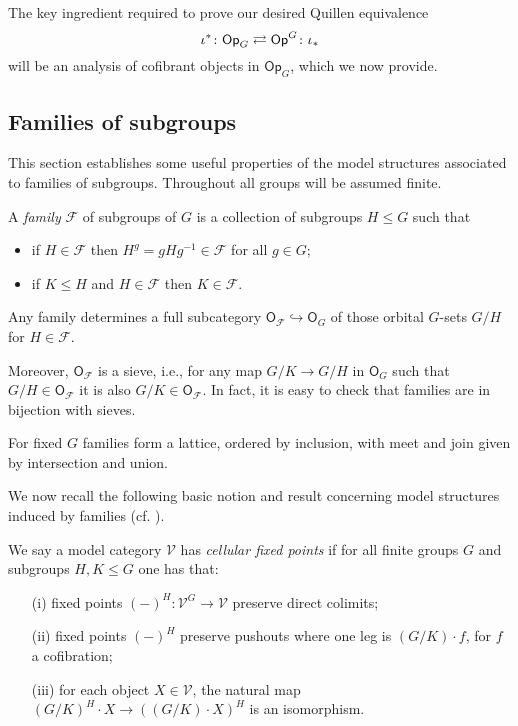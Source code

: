 \documentclass[a4paper,10pt]{article}%
\begin{document}
The key ingredient required to prove our desired Quillen equivalence
\[
	\iota^{\**} \colon
	\mathsf{Op}_G \rightleftarrows \mathsf{Op}^G
	\colon \iota_{\**}
\]
will be an analysis of cofibrant objects in $\mathsf{Op}_G$, which we now provide.


\subsection{Families of subgroups}


This section establishes some useful properties of the model structures associated to families of subgroups. Throughout all groups will be assumed finite.


\begin{definition}\label{FAMILY DEF}
	A \textit{family} $\mathcal{F}$ of subgroups of $G$ is a collection of subgroups 
	$H \leq G$ such that
	\begin{itemize}
	\item if $H \in \mathcal{F}$ then 
	$H^g = gHg^{-1} \in \mathcal{F}$ for all $g \in G$;
	\item if $K \leq H$ and $H \in \mathcal{F}$ then
	$K \in \mathcal{F}$.
	\end{itemize} 
\end{definition}

\begin{remark}\label{SIEVE REM}
	Any family determines a full subcategory 
	$\mathsf{O}_{\mathcal{F}} \hookrightarrow \mathsf{O}_G$
	of those orbital $G$-sets $G/H$ for 
	$H \in \mathcal{F}$.
	
	Moreover, $\mathsf{O}_{\mathcal{F}}$ is a sieve, i.e., for any map $G/K \to G/H$ in $\mathsf{O}_G$ such that $G/H \in \mathsf{O}_{\mathcal{F}}$ it is also $G/K \in \mathsf{O}_{\mathcal{F}}$. In fact, it is easy to check that families are in bijection with sieves.
\end{remark}


\begin{remark}
For fixed $G$ families form a lattice, ordered by inclusion, 
with meet and join given by intersection and union.
\end{remark}


We now recall the following basic notion and result concerning model structures induced by families (cf. \cite[Prop. 2.6]{Ste16}).


\begin{definition}\label{CELL DEF}
	We say a model category $\mathcal{V}$ has 
	\textit{cellular fixed points} if for all finite groups $G$ and subgroups $H,K\leq G$ one has that:
\begin{itemize}
	\item[(i)] fixed points $(\minus)^H \colon \mathcal{V}^G \to \mathcal{V}$ preserve direct colimits;
	\item[(ii)] fixed points $(\minus)^H$ preserve pushouts where one leg is $(G/K)\cdot f$, for $f$ a cofibration;
	\item[(iii)] for each object $X \in \mathcal{V}$, the natural map 
	$(G/K)^H \cdot X \to ((G/K) \cdot X)^H$
	is an isomorphism.
\end{itemize}
\end{definition}
\end{document}
